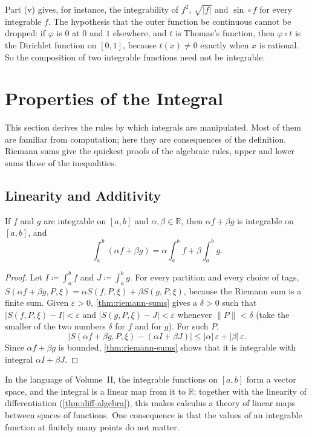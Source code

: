 Part (v) gives, for instance, the integrability of $f^2$, $\sqrt{|f|}$ and $\sin\circ f$ for every integrable $f$. The hypothesis that the outer function be continuous cannot be dropped: if $\varphi$ is $0$ at $0$ and $1$ elsewhere, and $t$ is Thomae's function, then $\varphi\circ t$ is the Dirichlet function on $[0,1]$, because $t(x)\ne0$ exactly when $x$ is rational. So the composition of two integrable functions need not be integrable.

\section{Properties of the Integral}
\label{sec:integral-properties}

This section derives the rules by which integrals are manipulated. Most of them are familiar from computation; here they are consequences of the definition. Riemann sums give the quickest proofs of the algebraic rules, upper and lower sums those of the inequalities.

\subsection{Linearity and Additivity}

\begin{theorem}[Linearity]
\label{thm:integral-linear}
If $f$ and $g$ are integrable on $[a,b]$ and $\alpha,\beta\in\mathbb R$, then $\alpha f+\beta g$ is integrable on $[a,b]$, and
\[
\int_a^b(\alpha f+\beta g)=\alpha\int_a^bf+\beta\int_a^bg .
\]
\end{theorem}

\begin{proof}
Let $I\coloneqq\int_a^bf$ and $J\coloneqq\int_a^bg$. For every partition and every choice of tags, $S(\alpha f+\beta g,P,\xi)=\alpha S(f,P,\xi)+\beta S(g,P,\xi)$, because the Riemann sum is a finite sum. Given $\varepsilon>0$, \cref{thm:riemann-sums} gives a $\delta>0$ such that $|S(f,P,\xi)-I|<\varepsilon$ and $|S(g,P,\xi)-J|<\varepsilon$ whenever $\|P\|<\delta$ (take the smaller of the two numbers $\delta$ for $f$ and for $g$). For such $P$,
\[
\bigl|S(\alpha f+\beta g,P,\xi)-(\alpha I+\beta J)\bigr|\le|\alpha|\,\varepsilon+|\beta|\,\varepsilon .
\]
Since $\alpha f+\beta g$ is bounded, \cref{thm:riemann-sums} shows that it is integrable with integral $\alpha I+\beta J$.
\end{proof}

In the language of Volume~II, the integrable functions on $[a,b]$ form a vector space, and the integral is a linear map from it to $\mathbb R$; together with the linearity of differentiation (\cref{thm:diff-algebra}), this makes calculus a theory of linear maps between spaces of functions. One consequence is that the values of an integrable function at finitely many points do not matter.

